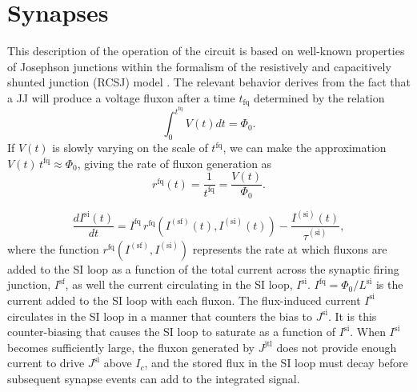 \documentclass[twocolumn]{article}
\begin{document}
\section{\label{sec:synapses}Synapses}


This description of the operation of the circuit is based on well-known properties of Josephson junctions within the formalism of the resistively and capacitively shunted junction (RCSJ) model \cite{vatu1998,ka1999,ti1996}. The relevant behavior derives from the fact that a JJ will produce a voltage fluxon after a time $t_{\mathrm{fq}}$ determined by the relation
\begin{equation}
\label{eq:jj__fluxon_production}
\int_0^{t^{\mathrm{fq}}}V(t)dt = \Phi_0.
\end{equation}
If $V(t)$ is slowly varying on the scale of $t^{\mathrm{fq}}$, we can make the approximation $V(t)\,t^{\mathrm{fq}} \approx \Phi_0$, giving the rate of fluxon generation as
\begin{equation}
\label{eq:jj__fluxon_rate}
r^{\mathrm{fq}}(t) =  \frac{1}{t^{\mathrm{fq}}} = \frac{V(t)}{\Phi_0}.
\end{equation}

\begin{equation}
\label{eq:synapses__leaky_integrator}
\frac{dI^{\mathrm{si}}(t)}{dt} = I^{\mathrm{fq}}\,r^{\mathrm{fq}}\left(I^{(\mathrm{sf})}(t),I^{(\mathrm{si})}(t)\right) -\frac{I^{(\mathrm{si})}(t)}{\tau^{(\mathrm{si})}},
\end{equation}
where the function $r^{\mathrm{fq}}\left(I^{(\mathrm{sf})},I^{(\mathrm{si})}\right)$ represents the rate at which fluxons are added to the SI loop as a function of the total current across the synaptic firing junction, $I^{\mathrm{sf}}$, as well the current circulating in the SI loop, $I^{\mathrm{si}}$. $I^{\mathrm{fq}} = \Phi_0/L^{\mathrm{si}}$ is the current added to the SI loop with each fluxon. The flux-induced current $I^{\mathrm{si}}$ circulates in the SI loop in a manner that counters the bias to $J^{\mathrm{si}}$. It is this counter-biasing that causes the SI loop to saturate as a function of $I^{\mathrm{si}}$. When $I^{\mathrm{si}}$ becomes sufficiently large, the fluxon generated by $J^{\mathrm{jtl}}$ does not provide enough current to drive $J^{\mathrm{si}}$ above $I_c$, and the stored flux in the SI loop must decay before subsequent synapse events can add to the integrated signal.
\end{document}
